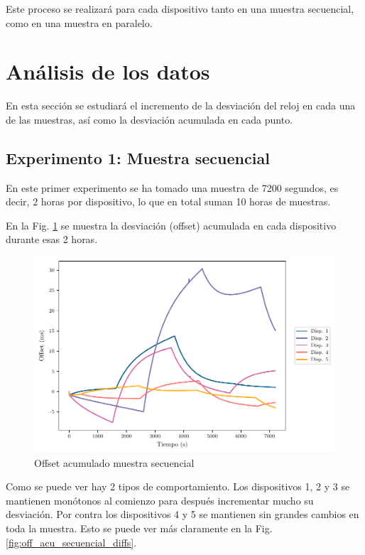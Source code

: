 Este proceso se realizará para cada dispositivo tanto en una muestra secuencial, como en una muestra en paralelo.


\section{Análisis de los datos}

En esta sección se estudiará el incremento de la desviación del reloj en cada una de las muestras, así como la desviación acumulada en cada punto.

\subsection{Experimento 1: Muestra secuencial}

En este primer experimento se ha tomado una muestra de \SI{7200}{} segundos, es decir, \SI{2}{} horas por dispositivo, lo que en total suman \SI{10}{} horas de muestras.

En la Fig. \ref{fig:off_acu_secuencial} se muestra la desviación (offset) acumulada en cada dispositivo durante esas \SI{2}{} horas.

\begin{figure}
    \centering
    \includegraphics[scale=0.65]{../Python/plots/individual/offset_plot}
    \caption{Offset acumulado muestra secuencial}
    \label{fig:off_acu_secuencial}
\end{figure}

Como se puede ver hay 2 tipos de comportamiento. Los dispositivos 1, 2 y 3 se mantienen monótonos al comienzo para después incrementar mucho su desviación. Por contra los dispositivos 4 y 5 se mantienen sin grandes cambios en toda la muestra. Esto se puede ver más claramente en la Fig. \ref{fig:off_acu_secuencial_diffs}.


